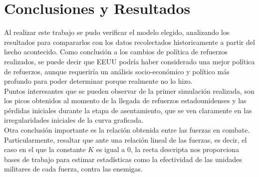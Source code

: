 \documentclass{sig-alternate}
\begin{document}
\section{Conclusiones y Resultados}

Al realizar este trabajo se pudo verificar el modelo elegido, analizando los resultados para compararlos con los datos recolectados historicamente
a partir del hecho acontecido. Como conclusión a los cambios de política de refuerzos realizados, se puede decir que EEUU podría haber considerado una
mejor política de refuerzos, aunque requeriría un análisis socio-económico y político más profundo para poder determinar porque realmente no
lo hizo.\\
Puntos interesantes que se pueden observar de la primer simulación realizada, son los picos obtenidos al momento de la llegada de refuerzos
estadounidenses y las pérdidas iniciales durante la etapa de asentamiento, que se ven claramente en las irregularidades iniciales de la curva 
graficada.\\
Otra conclusión importante es la relación obtenida entre las fuerzas en combate. Particularmente, resaltar que ante una relación lineal de las
fuerzas, es decir, el caso en el que la constante $K$ es igual a $0$, la recta descripta nos proporciona bases de trabajo para estimar estadísticas
como la efectividad de las unidades militares de cada fuerza, contra las enemigas.
\end{document}
